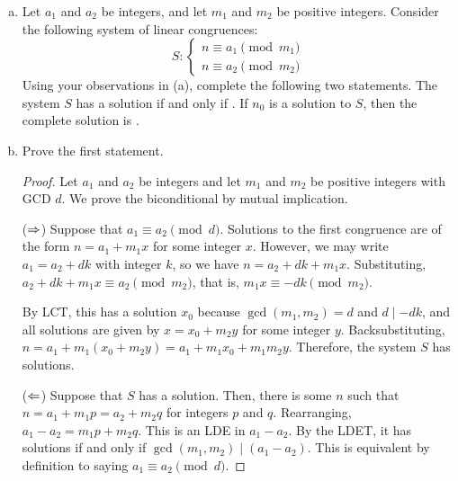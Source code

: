 \documentclass{agony}
\begin{document}
\begin{enumerate}[(a)]
  \item Let $a_1$ and $a_2$ be integers, and let $m_1$ and $m_2$ be positive integers.
        Consider the following system of linear congruences:
        \begin{equation*}
          S : \begin{cases}
            n \equiv a_1 \pmod{m_1} \\
            n \equiv a_2 \pmod{m_2}
          \end{cases}
        \end{equation*}
        Using your observations in (a), complete the following two statements.
        The system $S$ has a solution if and only if
        .
        If $n_0$ is a solution to $S$, then the complete solution is
        .

  \item Prove the first statement.
        \begin{proof}
          Let $a_1$ and $a_2$ be integers and let $m_1$ and $m_2$ be positive integers with GCD $d$.
          We prove the biconditional by mutual implication.

          ($\Rightarrow$) Suppose that $a_1 \equiv a_2 \pmod{d}$.
          Solutions to the first congruence are of the form $n = a_1 + m_1x$ for some integer $x$.
          However, we may write $a_1 = a_2 + dk$ with integer $k$, so we have $n = a_2 + dk + m_1x$.
          Substituting, $a_2 + dk + m_1x \equiv a_2 \pmod{m_2}$,
          that is, $m_1x \equiv -dk \pmod{m_2}$.

          By LCT, this has a solution $x_0$ because $\gcd(m_1,m_2)=d$ and $d \mid -dk$,
          and all solutions are given by $x = x_0 + m_2y$ for some integer $y$.
          Backsubstituting, $n = a_1 + m_1(x_0+m_2y) = a_1 + m_1x_0 + m_1m_2y$.
          Therefore, the system $S$ has solutions.

          ($\Leftarrow$) Suppose that $S$ has a solution.
          Then, there is some $n$ such that $n = a_1 + m_1p = a_2 + m_2q$ for integers $p$ and $q$.
          Rearranging, $a_1 - a_2 = m_1p + m_2q$.
          This is an LDE in $a_1-a_2$.
          By the LDET, it has solutions if and only if $\gcd(m_1,m_2) \mid (a_1 - a_2)$.
          This is equivalent by definition to saying $a_1 \equiv a_2 \pmod d$.
        \end{proof}
\end{enumerate}
\end{document}
